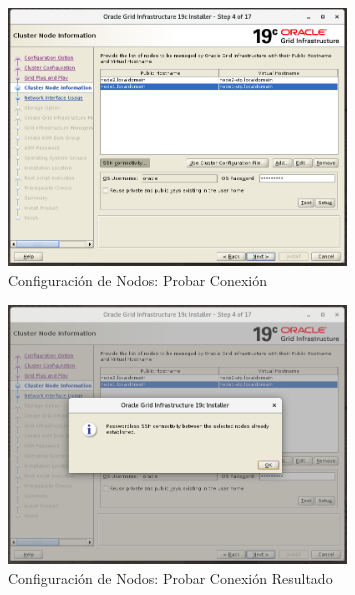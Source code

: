 \documentclass{article}
\begin{document}
\begin{figure}[H]
		\begin{center}
			\includegraphics[width=0.80\textwidth]{grid_install_04_2_cluster_node_information_test_connectivity.png}
		\end{center}
		\caption{Configuración de Nodos: Probar Conexión}
\end{figure}

\begin{figure}[H]
		\begin{center}
			\includegraphics[width=0.80\textwidth]{grid_install_04_3_cluster_node_information_success.png}
		\end{center}
		\caption{Configuración de Nodos: Probar Conexión Resultado}
\end{figure}
\end{document}
